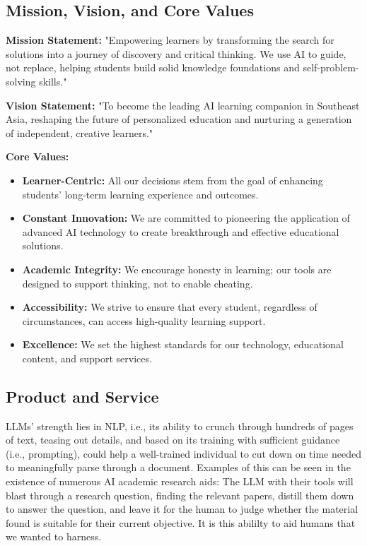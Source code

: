 \subsection{Mission, Vision, and Core Values}

\textbf{Mission Statement:}
"Empowering learners by transforming the search for solutions into a journey of discovery and critical thinking. We use
AI to guide, not replace, helping students build solid knowledge foundations and self-problem-solving skills."

\textbf{Vision Statement:}
"To become the leading AI learning companion in Southeast Asia, reshaping the future of personalized education and
nurturing a generation of independent, creative learners."

\textbf{Core Values:}
\begin{itemize}
    \item \textbf{Learner-Centric:} 
        All our decisions stem from the goal of enhancing students' long-term learning experience and outcomes.
    \item \textbf{Constant Innovation:}
        We are committed to pioneering the application of advanced AI technology to create breakthrough and effective
        educational solutions.
    \item \textbf{Academic Integrity:}  
        We encourage honesty in learning; our tools are designed to support thinking, not to enable cheating.
    \item \textbf{Accessibility:}
        We strive to ensure that every student, regardless of circumstances, can access high-quality learning support.
    \item \textbf{Excellence:}  
        We set the highest standards for our technology, educational content, and support services.
\end{itemize}

\subsection{Product and Service}
LLMs' strength lies in NLP, i.e., its ability to crunch through hundreds of pages of text, teasing out details, and
based on its training with sufficient guidance (i.e., prompting), could help a well-trained individual to cut down on
time needed to meaningfully parse through a document. Examples of this can be seen in the existence of numerous AI
academic research aids: The LLM with their tools will blast through a research question, finding the relevant papers,
distill them down to answer the question, and leave it for the human to judge whether the material found is suitable
for their current objective. It is this abililty to aid humans that we wanted to harness.

